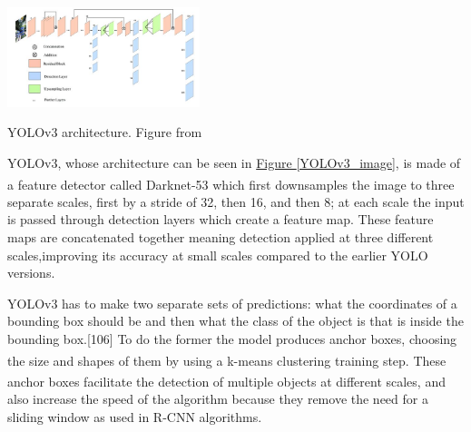 \documentclass[11pt]{article}		%
\newcommand{\supercite}[1]{\textsuperscript{\cite{#1}}}		%
\newcommand{\figref}[1]{\hyperref[#1]{Figure \ref*{#1}}}    %
\begin{document}
	        \begin{floatingfigure}[r]{0.45\textwidth}
				\centering
			    \includegraphics[width=0.42\textwidth]{Network-architecture-of-YOLOv3_W640.jpg}
			    \caption{YOLOv3 architecture. Figure from \cite{YOLOv3_image}}
			    \label{YOLOv3_image}
			\end{floatingfigure}
			
            YOLOv3, whose architecture can be seen in \figref{YOLOv3_image}, is made of a feature detector called Darknet-53\supercite{YOLOV3} which first downsamples the image to three separate scales, first by a stride of 32, then 16, and then 8; at each scale the input is passed through detection layers which create a feature map. These feature maps are concatenated together meaning detection applied at three different scales,improving its accuracy at small scales compared to the earlier YOLO versions.
 
			\begin{floatingfigure}[r]{0pt} \end{floatingfigure}
			
			 \hspace*{3ex}
            YOLOv3 has to make two separate sets of predictions: what the coordinates of a bounding box should be and then what the class of the object is that is inside the bounding box.[106] To do the former the model produces anchor boxes, choosing the size and shapes of them by using a k-means clustering training step.\supercite{YOLOV2} These anchor boxes facilitate the detection of multiple objects at different scales,\supercite{k-means-clustering} and also increase the speed of the algorithm because they remove the need for a sliding window as used in R-CNN algorithms.
	        \\
	    
\end{document}
